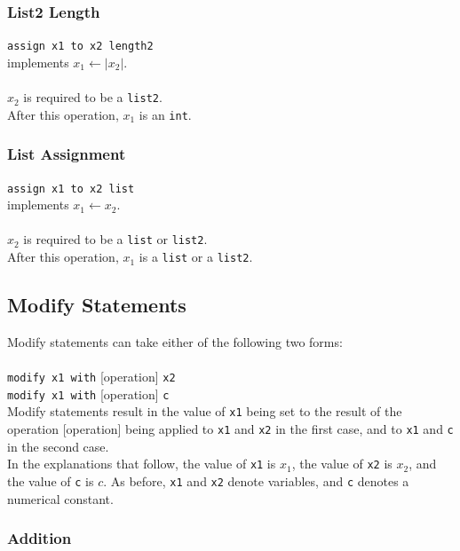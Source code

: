 \subsubsection{List2 Length} 

\texttt{assign x1 to x2 length2} \\
implements $x_1 \leftarrow |x_2|$. \\ \\  
$x_2$ is required to be a \texttt{list2}. \\
After this operation, $x_1$ is an \texttt{int}.

\subsubsection{List Assignment}

\texttt{assign x1 to x2 list} \\
implements $x_1 \leftarrow x_2$. \\ \\  
$x_2$ is required to be a \texttt{list} or \texttt{list2}. \\
After this operation, $x_1$ is a \texttt{list} or a \texttt{list2}.

\subsection{Modify Statements}

Modify statements can take either of the following two forms: \\ \\
\texttt{modify x1 with} [operation] \texttt{x2} \\ 
\texttt{modify x1 with} [operation] \texttt{c} \\

Modify statements result in the value of \texttt{x1} being set to the result of the operation [operation] being applied to \texttt{x1} and \texttt{x2} in the first case, and to \texttt{x1} and \texttt{c} in the second case. \\

In the explanations that follow, the value of \texttt{x1} is $x_1$, the value of \texttt{x2} is $x_2$, and the value of \texttt{c} is $c$. As before, \texttt{x1} and \texttt{x2} denote variables, and \texttt{c} denotes a numerical constant. 

\subsubsection{Addition}

